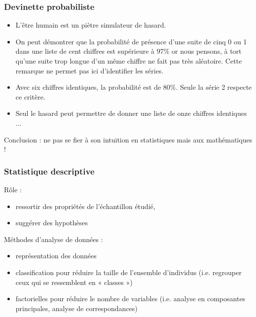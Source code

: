 \documentclass[10pt, french]{beamer}
\begin{document}
\begin{frame}\frametitle{Devinette probabiliste}
\begin{itemize}
\item 
L'être humain est un piètre simulateur de hasard.
\item  On peut démontrer que la probabilité de présence
d'une suite de cinq 0 ou 1 dans une liste de cent
chiffres est supérieure à 97$\%$ or nous pensons, à
tort qu'une suite trop longue d'un même chiffre ne
fait pas très aléatoire. Cette remarque ne permet
pas ici d'identifier les séries.
\item  Avec six chiffres identiques, la probabilité est de
80$\%$. Seule la série 2 respecte ce critère.
\item   Seul le hasard peut permettre de donner une liste
de onze chiffres identiques$\dots$
\end{itemize}
Conclusion : ne pas se fier à son intuition en statistiques mais aux mathématiques ! 
\end{frame}



\begin{frame}\frametitle{Statistique descriptive}
Rôle :
\begin{itemize}
\item ressortir des propriétés de l'échantillon étudié,
\item suggérer des hypothèses
\end{itemize}
Méthodes d'analyse de données :
\begin{itemize}
\item représentation des données
\item classification pour réduire la taille de l'ensemble
d'individus (i.e. regrouper ceux qui se ressemblent
en « classes »)
\item factorielles pour réduire le nombre de variables
(i.e. analyse en composantes principales, analyse de
correspondances)
\end{itemize}
\end{frame}
\end{document}
